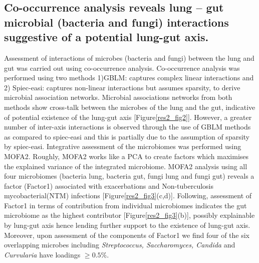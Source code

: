 \subsection{Co-occurrence analysis reveals lung – gut microbial (bacteria and fungi) interactions suggestive of a potential lung-gut axis.}
Assessment of interactions of microbes (bacteria and fungi) between the lung and gut was carried out using co-occurrence analysis. Co-occurrence analysis was performed using two methods 1)GBLM: captures complex linear interactions and 2) Spiec-easi: captures non-linear interactions but assumes sparsity, to derive microbial association networks. Microbial associations networks from both methods show cross-talk between the microbes of the lung and the gut, indicative of potential existence of the lung-gut axis [Figure\ref{res2_fig2}]. However, a greater number of inter-axis interactions is observed through the use of GBLM methods as compared to spiec-easi and this is partially due to the assumption of sparsity by spiec-easi. Integrative assessment of the microbiomes was performed using MOFA2. Roughly, MOFA2 works like a PCA to create factors which maximises the explained variance of the integrated microbiome. MOFA2 analysis using all four microbiomes (bacteria lung, bacteria gut, fungi lung and fungi gut) reveals a factor (Factor1) associated with exacerbations and Non-tuberculosis mycobacterial(NTM) infections [Figure\ref{res2_fig3}(c,d)]. Following, assessment of Factor1 in terms of contribution from individual microbiomes indicates the gut microbiome as the highest contributor [Figure\ref{res2_fig3}(b)], possibly explainable by lung-gut axis hence lending further support to the existence of lung-gut axis. Moreover, upon assessment of the components of Factor1 we find four of the six overlapping microbes including \emph{Streptococcus, Saccharomyces, Candida} and \emph{Curvularia} have loadings $\geq 0.5\%$.


